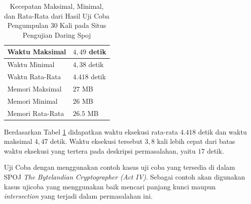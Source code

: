 \begin{table}[H]
	\centering
	\caption{Kecepatan Maksimal, Minimal, dan Rata-Rata dari Hasil Uji Coba Pengumpulan 30 Kali pada Situs Pengujian Daring Spoj}
	\begin{tabular}{|l|l|} \hline
		Waktu Maksimal & $ 4,49 $ detik\\ \hline
		Waktu Minimal & $ 4,38 $ detik\\ \hline
		Waktu Rata-Rata & $ 4.418 $ detik\\ \hline
		Memori Maksimal & $ 27 $ MB\\ \hline
		Memori Minimal & $ 26 $ MB\\ \hline
		Memori Rata-Rata & $ 26.5 $ MB\\ \hline
	\end{tabular}
	\label{tab:statistik}
\end{table}

\indent Berdasarkan Tabel \ref{tab:statistik} didapatkan waktu eksekusi rata-rata $ 4.418 $ detik dan waktu maksimal $ 4,47 $ detik. Waktu eksekusi tersebut $3,8$ kali lebih cepat dari batas waktu eksekusi yang tertera pada deskripsi permasalahan, yaitu $ 17 $ detik.


\indent Uji Coba dengan menggunakan contoh kasus uji coba yang tersedia di dalam SPOJ \textit{The Bytelandian Cryptographer (Act IV)}. Sebagai contoh akan digunakan kasus ujicoba yang menggunakan baik mencari panjang kunci maupun \textit{intersection} yang terjadi dalam permasalahan ini.


